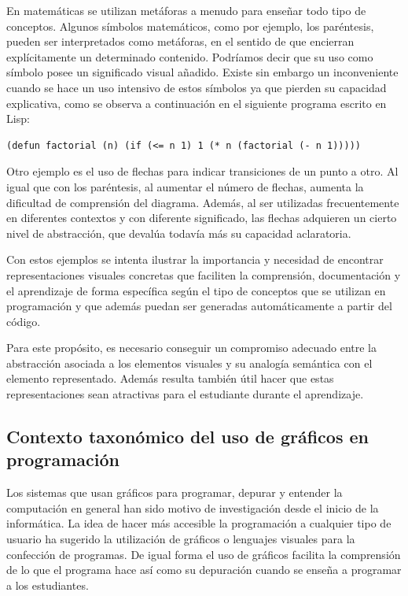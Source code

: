 \documentclass{llncs}
\begin{document}
En matemáticas se utilizan metáforas a menudo para enseñar todo tipo de conceptos. Algunos símbolos matemáticos, como por ejemplo, los paréntesis, pueden ser interpretados como metáforas, en el sentido de que encierran explícitamente un determinado contenido. Podríamos decir que su uso como símbolo posee un significado visual añadido. Existe sin embargo un inconveniente cuando se hace un uso intensivo de estos símbolos ya que pierden su capacidad explicativa, como se observa a continuación en el siguiente programa escrito en Lisp:

\begin{verbatim}
(defun factorial (n) (if (<= n 1) 1 (* n (factorial (- n 1)))))
\end{verbatim}

Otro ejemplo es el uso de flechas para indicar transiciones de un punto a otro. Al igual que con los paréntesis, al aumentar el número de flechas, aumenta la dificultad de comprensión del diagrama. Además, al ser utilizadas frecuentemente en diferentes contextos y con diferente significado, las flechas adquieren un cierto nivel de abstracción, que devalúa todavía más su capacidad aclaratoria. 

Con estos ejemplos se intenta ilustrar la importancia y necesidad de encontrar representaciones visuales concretas que faciliten la comprensión, documentación y el aprendizaje de forma específica según el tipo de conceptos que se utilizan en programación y que además puedan ser generadas automáticamente a partir del código. 

Para este propósito, es necesario conseguir un compromiso adecuado entre la abstracción asociada a los elementos visuales y su analogía semántica con el elemento representado. Además resulta también útil hacer que estas representaciones sean atractivas para el estudiante durante el aprendizaje. 
\subsection{Contexto taxonómico del uso de gráficos en programación}
\label{subsec:taxonomy}
Los sistemas que usan gráficos para programar, depurar y entender la computación en general han sido motivo de investigación desde el inicio de la informática. La idea de hacer más accesible la programación a cualquier tipo de usuario ha sugerido la utilización de gráficos o lenguajes visuales para la confección de programas. De igual forma el uso de gráficos facilita la comprensión de lo que el programa hace así como su depuración cuando se enseña a programar a los estudiantes. 
\end{document}
